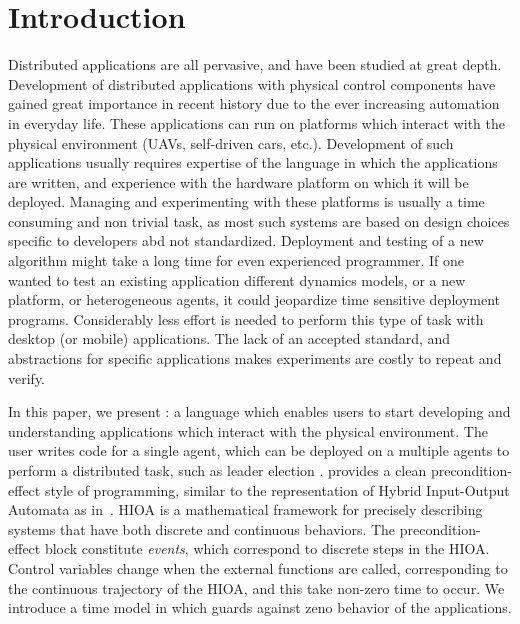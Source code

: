 \section{Introduction}
Distributed applications are all pervasive, and have been studied at great depth. Development of distributed applications with physical control components have gained great importance in recent history due to the ever increasing automation in everyday life. These applications can run on platforms which interact with the physical environment (UAVs, self-driven cars, etc.). Development of such applications usually requires expertise of the language in which the applications are written, and experience with the hardware platform on which it will be deployed.  Managing and experimenting with these platforms is usually a time consuming and non trivial task, as most such systems are based on design choices specific to developers abd not standardized.
Deployment and testing of a new algorithm might take a long time for even experienced programmer.  If one wanted to test an existing application different dynamics models, or a new platform, or heterogeneous agents, it could jeopardize time sensitive deployment programs.  Considerably less effort is needed to perform this type of task with desktop (or mobile) applications. The lack of an accepted standard, and abstractions for specific applications makes experiments are costly to repeat and verify. 

In this paper, we present \rolang: a language which enables users to start developing and understanding applications which interact with the physical environment. The user writes code for a single agent, which can be deployed on a multiple agents to perform a distributed task, such as leader election . \rolang provides a clean precondition-effect style of programming, similar to the representation of Hybrid Input-Output Automata as in~\cite{lynch1996hybrid}. HIOA is a mathematical framework for precisely describing
systems that have both discrete and continuous behaviors. The precondition-effect block constitute \emph{events}, which correspond to discrete steps in the HIOA. Control variables change when the external functions are called, corresponding to the continuous trajectory of the HIOA, and this take non-zero time to occur. We introduce a time model in  which guards against zeno behavior of the applications.  

